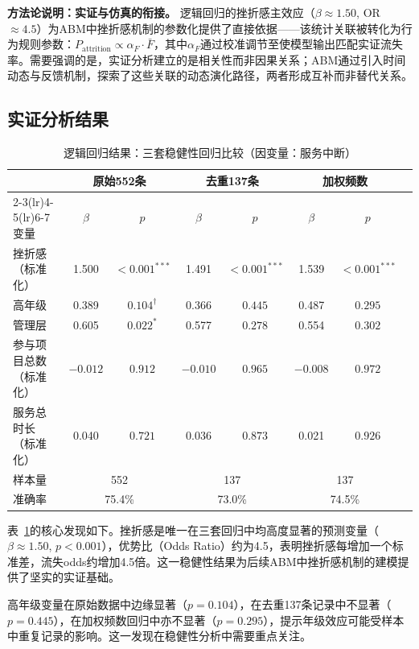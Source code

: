 \documentclass[12pt,a4paper]{article}
\begin{document}
\textbf{方法论说明：实证与仿真的衔接。} 逻辑回归的挫折感主效应（$\beta \approx 1.50$, OR $\approx 4.5$）为ABM中挫折感机制的参数化提供了直接依据——该统计关联被转化为行为规则参数：$P_{\text{attrition}} \propto \alpha_F \cdot \bar{F}$，其中$\alpha_F$通过校准调节至使模型输出匹配实证流失率。需要强调的是，实证分析建立的是相关性而非因果关系；ABM通过引入时间动态与反馈机制，探索了这些关联的动态演化路径，两者形成互补而非替代关系。

\subsection{实证分析结果}

\begin{table}[H]
\centering
\caption{逻辑回归结果：三套稳健性回归比较（因变量：服务中断）}
\label{tab:reg_table}
\begin{tabular}{lccccccc}
\toprule
 & \multicolumn{2}{c}{原始552条} & \multicolumn{2}{c}{去重137条} & \multicolumn{2}{c}{加权频数} \\
\cmidrule(lr){2-3}\cmidrule(lr){4-5}\cmidrule(lr){6-7}
变量 & $\beta$ & $p$ & $\beta$ & $p$ & $\beta$ & $p$ \\
\midrule
挫折感（标准化） & 1.500 & $<0.001^{***}$ & 1.491 & $<0.001^{***}$ & 1.539 & $<0.001^{***}$ \\
高年级 & 0.389 & $0.104^{\dagger}$ & 0.366 & $0.445$ & 0.487 & $0.295$ \\
管理层 & 0.605 & $0.022^{*}$ & 0.577 & $0.278$ & 0.554 & $0.302$ \\
参与项目总数（标准化） & $-0.012$ & $0.912$ & $-0.010$ & $0.965$ & $-0.008$ & $0.972$ \\
服务总时长（标准化） & 0.040 & $0.721$ & 0.036 & $0.873$ & 0.021 & $0.926$ \\
\midrule
样本量 & \multicolumn{2}{c}{552} & \multicolumn{2}{c}{137} & \multicolumn{2}{c}{137} \\
准确率 & \multicolumn{2}{c}{75.4\%} & \multicolumn{2}{c}{73.0\%} & \multicolumn{2}{c}{74.5\%} \\
\bottomrule
\end{tabular}
\end{table}

表~\ref{tab:reg_table}的核心发现如下。挫折感是唯一在三套回归中均高度显著的预测变量（$\beta \approx 1.50$, $p < 0.001$），优势比（Odds Ratio）约为4.5，表明挫折感每增加一个标准差，流失odds约增加4.5倍。这一稳健性结果为后续ABM中挫折感机制的建模提供了坚实的实证基础。

高年级变量在原始数据中边缘显著（$p = 0.104$），在去重137条记录中不显著（$p = 0.445$），在加权频数回归中亦不显著（$p = 0.295$），提示年级效应可能受样本中重复记录的影响。这一发现在稳健性分析中需要重点关注。
\end{document}
